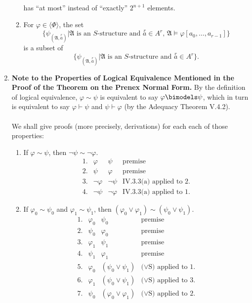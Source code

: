 \begin{enumerate}[1.]
\begin{enumerate}[(1)]
\[\]
has ``at most'' instead of ``exactly'' $2^{n + 1}$ elements.
\item For $\varphi \in \langle \Phi \rangle$, the set
\[
\{ \psi_{(\mathfrak{A}, \stackrel{r}{a})} | \mbox{$\mathfrak{A}$ is an $S$-structure and $\stackrel{r}{a} \in A^r$, $\mathfrak{A} \models \varphi[a_0, \ldots, a_{r - 1}]$} \}
\]
is a subset of
\[
\{ \psi_{(\mathfrak{A}, \stackrel{r}{a})} | \mbox{$\mathfrak{A}$ is an $S$-structure and $\stackrel{r}{a} \in A^r$} \}.
\]
\end{enumerate}
%
\item \textbf{Note to the Properties of Logical Equivalence Mentioned in the Proof of the Theorem on the Prenex Normal Form.} By the definition of logical equivalence, $\varphi \sim \psi$ is equivalent to say $\varphi \bimodels \psi$, which in turn is equivalent to say $\varphi \vdash \psi$ and $\psi \vdash \varphi$ (by the Adequacy Theorem V.4.2).\\
\\
We shall give proofs (more precisely, derivations) for each each of those properties:
\begin{enumerate}[(1)]
\item If $\varphi \sim \psi$, then $\neg \psi \sim \neg \varphi$.
\[
\begin{array}{llll}
1. & \varphi & \psi & \mbox{premise} \\
2. & \psi & \varphi & \mbox{premise} \\
3. & \neg \varphi & \neg \psi & \mbox{IV.3.3(a) applied to 2.} \\
4. & \neg \psi & \neg \varphi & \mbox{IV.3.3(a) applied to 1.}
\end{array}
\]
\item If $\varphi_0 \sim \psi_0$ and $\varphi_1 \sim \psi_1$, then $(\varphi_0 \lor \varphi_1) \sim (\psi_0 \lor \psi_1)$.
\[
\begin{array}{llll}
1. & \varphi_0 & \psi_0 & \mbox{premise} \\
2. & \psi_0 & \varphi_0 & \mbox{premise} \\
3. & \varphi_1 & \psi_1 & \mbox{premise} \\
4. & \psi_1 & \varphi_1 & \mbox{premise} \\
5. & \varphi_0 & (\psi_0 \lor \psi_1) & \mbox{($\lor$S) applied to 1.} \\
6. & \varphi_1 & (\psi_0 \lor \psi_1) & \mbox{($\lor$S) applied to 3.} \\
7. & \psi_0 & (\varphi_0 \lor \varphi_1) & \mbox{($\lor$S) applied to 2.} \\

\end{array}\]
\end{enumerate}
\end{enumerate}
